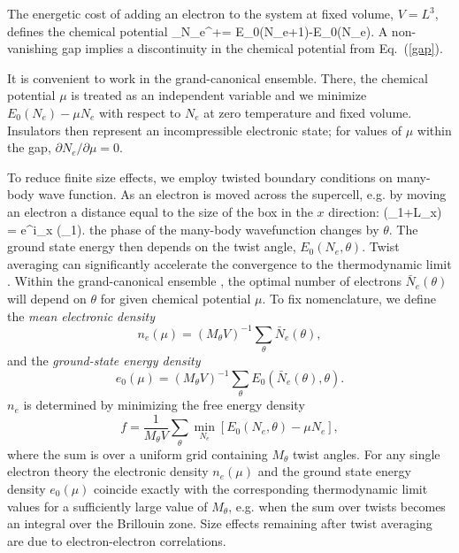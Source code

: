 The energetic cost of adding an electron to the system at fixed volume, $V=L^3$, defines the
chemical potential
\beq
\mu_{N_e}^+= E_0(N_e+1)-E_0(N_e).
\eeq
A non-vanishing gap implies a discontinuity in the chemical potential from Eq.~(\ref{gap}).

It is convenient to work in the grand-canonical ensemble. There, the
chemical potential $\mu$ is treated as an independent variable and we minimize $E_0(N_e)-\mu N_e$ with respect to $N_e$ at zero temperature and fixed volume. Insulators then represent an incompressible electronic state; for values of $\mu$
within the gap, $\partial N_e/\partial \mu=0$.

To reduce finite size effects, we employ twisted boundary conditions on many-body wave function.
As an electron is moved across the supercell, e.g. by moving an electron a distance equal to the size of the box in the $x$ direction:
\beq
\Psi (\rvec_1+L_x) = e^{i\theta_x} \Psi(\rvec_1).
\eeq
the phase of the many-body wavefunction changes by $\theta$.
The ground state energy  then depends on the twist angle, $E_0(N_e,\theta)$. 
Twist averaging
can significantly accelerate the convergence 
to the thermodynamic limit \cite{Lin01}.
Within the grand-canonical ensemble \cite{fse,finitesize}, the optimal number
of electrons ${\bar N}_e(\theta)$ will depend  on $\theta$ for given chemical potential $\mu$. To fix nomenclature, we define the
\emph{mean electronic density}
\begin{equation} \label{eq:ne}
n_e(\mu)=(M_\theta V)^{-1}\sum_\theta  {\bar N}_e(\theta),
\end{equation}
and the \emph{ground-state energy density}
\begin{equation} \label{eq:e0}
e_0(\mu)=(M_\theta V)^{-1} \sum_\theta E_0({\bar N}_e(\theta),\theta).
\end{equation}
$n_e$ is determined by minimizing the free energy density
\begin{equation}
f=\frac{1}{M_\theta V} \sum_\theta \min_{N_e} \left[ E_0(N_e,\theta) - \mu N_e \right],
\end{equation}
where the sum is over a uniform grid containing $M_\theta$ twist angles.
For any single electron theory the electronic density $n_e(\mu)$
and the ground state energy density $e_0(\mu)$ coincide exactly with the corresponding
thermodynamic limit values for a sufficiently large value of $M_\theta$, e.g. when the sum over twists becomes an integral over the 
Brillouin zone.  Size effects remaining after twist averaging are due to electron-electron correlations.

